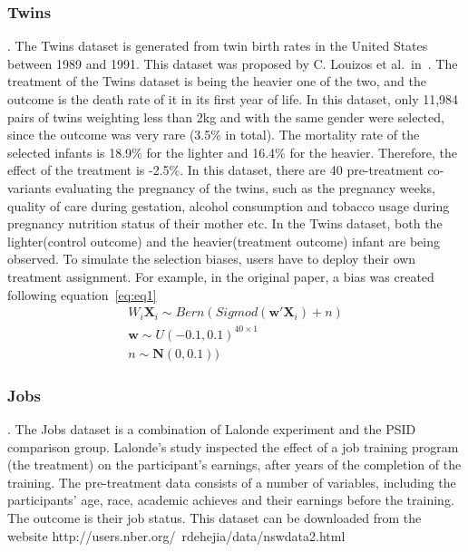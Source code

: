 \subsubsection{Twins}.
The Twins dataset is generated from twin birth rates in the United States between 1989 and 1991\cite{almond2005costs}.
This dataset was proposed by C. Louizos et al.\ in~\cite{louizos2017causal}.
The treatment of the Twins dataset is being the heavier one of the two, and the outcome is the death rate of it in its
first year of life.
In this dataset, only 11,984 pairs of twins weighting less than 2kg and with the same gender were selected, since the
outcome was very rare (3.5\% in total).
The mortality rate of the selected infants is 18.9\% for the lighter and 16.4\% for the heavier.
Therefore, the effect of the treatment is -2.5\%.
In this dataset, there are 40 pre-treatment co-variants evaluating the pregnancy of the twins, such as the pregnancy
weeks, quality of care during gestation, alcohol consumption and tobacco usage during pregnancy nutrition status of
their mother etc.
In the Twins dataset, both the lighter(control outcome) and the heavier(treatment outcome) infant are being observed.
To simulate the selection biases, users have to deploy their own treatment assignment.
For example, in the original paper\cite{louizos2017causal}, a bias was created following equation~\eqref{eq:eq1}
\begin{equation}
    \begin{split}
        W_i\mathbf{X}_i\sim Bern(Sigmod(\mathbf{w'}\mathbf{X}_i)+n)\\
        \mathbf{w}\sim U(-0.1, 0.1)^{40\times 1}\\
        n\sim \mathbf{N}(0, 0.1))
    \end{split}
    \label{eq:eq1}
\end{equation}

\subsubsection{Jobs}.
The Jobs dataset is a combination of Lalonde experiment\cite{lalonde1986evaluating} and the PSID comparison group.
Lalonde's study inspected the effect of a job training program (the treatment) on the participant's earnings, after
years of the completion of the training.
The pre-treatment data consists of a number of variables, including the participants' age, race, academic achieves and
their earnings before the training.
The outcome is their job status.
This dataset can be downloaded from the website http://users.nber.org/~rdehejia/data/nswdata2.html


